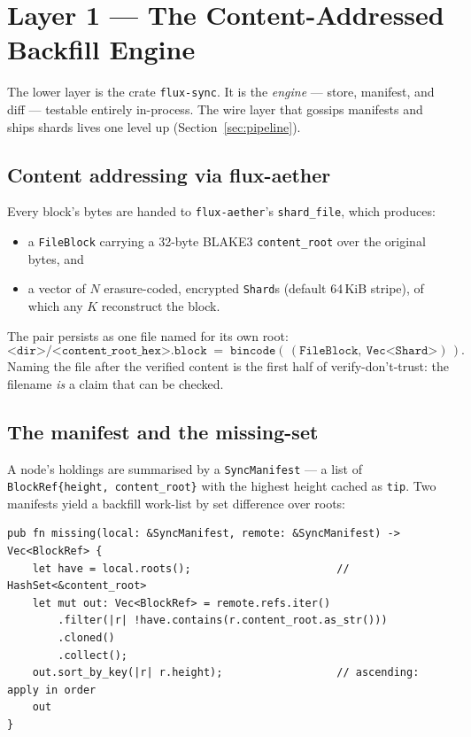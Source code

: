\documentclass[11pt,a4paper]{article}
\newcommand{\code}[1]{\lstinline[basicstyle=\ttfamily\normalsize\color{codekw}]{#1}}
\begin{document}
\section{Layer 1 --- The Content-Addressed Backfill Engine}

The lower layer is the crate \texttt{flux-sync}. It is the \emph{engine} ---
store, manifest, and diff --- testable entirely in-process. The wire layer that
gossips manifests and ships shards lives one level up (Section~\ref{sec:pipeline}).

\subsection{Content addressing via flux-aether}

Every block's bytes are handed to \texttt{flux-aether}'s
\code{shard_file}, which produces:

\begin{itemize}[leftmargin=1.5em]
  \item a \texttt{FileBlock} carrying a 32-byte BLAKE3 \texttt{content\_root}
        over the original bytes, and
  \item a vector of $N$ erasure-coded, encrypted \texttt{Shard}s (default
        64\,KiB stripe), of which any $K$ reconstruct the block.
\end{itemize}

\noindent
The pair persists as one file named for its own root:
\[
  \texttt{<dir>/<content\_root\_hex>.block} \;=\;
  \texttt{bincode}\!\left(\,(\texttt{FileBlock},\ \texttt{Vec<Shard>})\,\right).
\]
Naming the file after the verified content is the first half of
verify-don't-trust: the filename \emph{is} a claim that can be checked.

\subsection{The manifest and the missing-set}

A node's holdings are summarised by a \texttt{SyncManifest} --- a list of
\texttt{BlockRef\{height, content\_root\}} with the highest height cached as
\texttt{tip}. Two manifests yield a backfill work-list by set difference over
roots:

\begin{lstlisting}
pub fn missing(local: &SyncManifest, remote: &SyncManifest) -> Vec<BlockRef> {
    let have = local.roots();                       // HashSet<&content_root>
    let mut out: Vec<BlockRef> = remote.refs.iter()
        .filter(|r| !have.contains(r.content_root.as_str()))
        .cloned()
        .collect();
    out.sort_by_key(|r| r.height);                  // ascending: apply in order
    out
}
\end{lstlisting}
\end{document}
